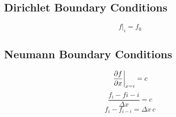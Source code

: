 \subsection{Dirichlet Boundary Conditions}
\begin{equation}
    f\rvert_i = f_0
\end{equation}

\subsection{Neumann Boundary Conditions}
\begin{equation}
    \left. \pdv{f}{x} \right|_{x = i} = c
\end{equation}
\begin{equation}
    \frac{f_i - f{i - i}}{\Delta x} = c
\end{equation}
\begin{equation}
    f_i - f_{i - i}= \Delta x \, c
\end{equation}
